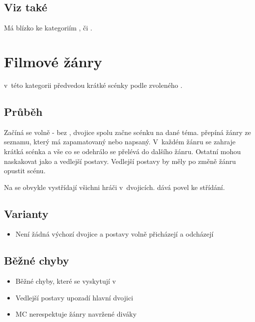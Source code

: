 \subsection{ Viz také } Má blízko ke kategoriím ,  či . 
 
 
 
 
\needspace{5cm} \section{Filmové žánry} \label{filmové žánry}  
 
 
 v~této kategorii předvedou krátké scénky podle zvoleného . 
 
 
\subsection{Průběh} Začíná se volně - bez  , dvojice spolu začne scénku na dané téma.  přepíná žánry ze seznamu, který má zapamatovaný nebo napsaný. V~každém žánru se zahraje krátká scénka a vše co se odehrálo se přelévá do dalšího žánru. Ostatní  mohou naskakovat jako  a vedlejší postavy. Vedlejší postavy by měly po změně žánru opustit scénu.  
 
Na  se obvykle vystřídají všichni hráči v~dvojicích.  dává povel ke střídání. 
 
\subsection{ Varianty } \begin{itemize}
\item Není žádná výchozí dvojice a postavy volně přicházejí a odcházejí
\end{itemize}
 
\subsection{ Běžné chyby } \begin{itemize}
\item Běžné chyby, které se vyskytují v~
\item Vedlejší postavy upozadí hlavní dvojici
\item MC nerespektuje žánry navržené diváky
\end{itemize}
 
